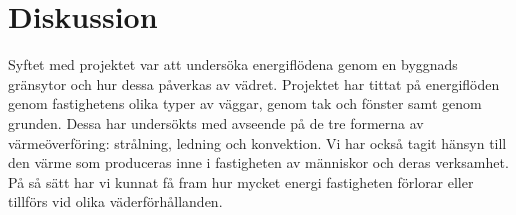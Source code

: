 \chapter{Diskussion}

Syftet med projektet var att undersöka energiflödena genom en byggnads gränsytor och hur dessa påverkas av vädret. Projektet har tittat på energiflöden genom fastighetens olika typer av väggar, genom tak och fönster samt genom grunden. Dessa har undersökts med avseende på de tre formerna av värmeöverföring: strålning, ledning och konvektion. Vi har också tagit hänsyn till den värme som produceras inne i fastigheten av människor och deras verksamhet. På så sätt har vi kunnat få fram hur mycket energi fastigheten förlorar eller tillförs vid olika väderförhållanden.








